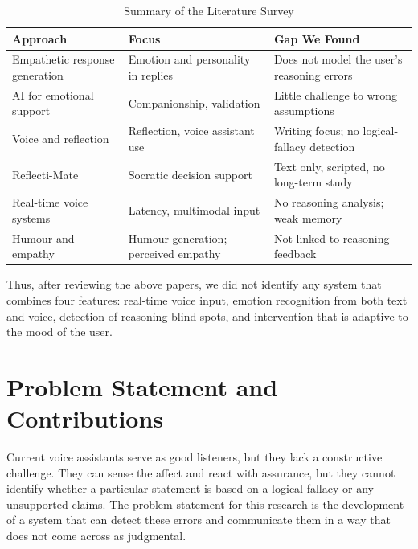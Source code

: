\documentclass[conference]{IEEEtran}
\begin{document}
\begin{table}[htbp]
\caption{Summary of the Literature Survey}
\label{tab:lit}
\begin{center}
\small
\begin{tabular}{|p{1.9cm}|p{2.5cm}|p{2.9cm}|}
\hline
\textbf{Approach} & \textbf{Focus} & \textbf{Gap We Found} \\
\hline
Empathetic response generation \cite{r2,r3,r4,r5,r6} & Emotion and personality in replies & Does not model the user's reasoning errors \\
\hline
AI for emotional support \cite{r7,r8} & Companionship, validation & Little challenge to wrong assumptions \\
\hline
Voice and reflection \cite{r9,r10,r11} & Reflection, voice assistant use & Writing focus; no logical-fallacy detection \\
\hline
Reflecti-Mate \cite{r12} & Socratic decision support & Text only, scripted, no long-term study \\
\hline
Real-time voice systems \cite{r13,r14} & Latency, multimodal input & No reasoning analysis; weak memory \\
\hline
Humour and empathy \cite{r15,r16} & Humour generation; perceived empathy & Not linked to reasoning feedback \\
\hline
\end{tabular}
\end{center}
\end{table}

Thus, after reviewing the above papers, we did not identify any system that combines four features: real-time voice input, emotion recognition from both text and voice, detection of reasoning blind spots, and intervention that is adaptive to the mood of the user.

\section{Problem Statement and Contributions}
Current voice assistants serve as good listeners, but they lack a constructive challenge. They can sense the affect and react with assurance, but they cannot identify whether a particular statement is based on a logical fallacy or any unsupported claims. The problem statement for this research is the development of a system that can detect these errors and communicate them in a way that does not come across as judgmental.
\end{document}
